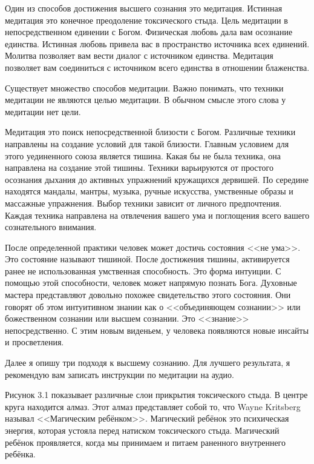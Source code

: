 \documentclass[10pt, fleqn]{article}
\begin{document}

Один из способов достижения высшего сознания это медитация. Истинная медитация это конечное преодоление токсического стыда. Цель медитации в непосредственном единении с Богом. Физическая любовь дала вам осознание единства. Истинная любовь привела вас в пространство источника всех единений. Молитва позволяет вам вести диалог с источником единства. Медитация позволяет вам соединиться с источником всего единства в отношении блаженства. 


Существует множество способов медитации. Важно понимать, что техники медитации не являются целью медитации. В обычном смысле этого слова у медитации нет цели.

Медитация это поиск непосредственной близости с Богом. Различные техники направлены на создание условий для такой близости. Главным условием для этого уединенного союза является тишина. Какая бы не была техника, она направлена на создание этой тишины. Техники варьируются от простого осознания дыхания до активных упражнений кружащихся дервишей. По середине находятся мандалы, мантры, музыка, ручные искусства, умственные образы и массажные упражнения. Выбор техники зависит от личного предпочтения. Каждая техника направлена на отвлечения вашего ума и поглощения всего вашего сознательного внимания.

После определенной практики человек может достичь состояния <<не ума>>. Это состояние называют тишиной. После достижения тишины, активируется ранее не использованная умственная способность. Это форма интуиции. С помощью этой способности, человек может напрямую познать Бога. Духовные мастера представляют довольно похожее свидетельство этого состояния. Они говорят об этом интуитивном знании как о <<объединяющем сознании>> или божественном сознании или высшем сознании. Это <<знание>> непосредственно. С этим новым виденьем, у человека появляются новые инсайты и просветления.


Далее я опишу три подходя к высшему сознанию. Для лучшего результата, я рекомендую вам записать инструкции по медитации на аудио.



Рисунок 3.1 показывает различные слои прикрытия токсического стыда. В центре круга находится алмаз. Этот алмаз представляет собой то, что Wayne Kritsberg называл <<Магическим ребёнком>>. Магический ребёнок это психическая энергия, которая устояла перед натиском токсического стыда. Магический ребёнок проявляется, когда мы принимаем и питаем раненного внутреннего ребёнка.
\end{document}
